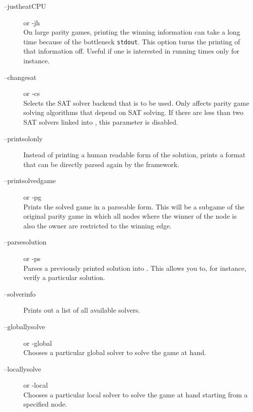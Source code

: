\begin{description}
\item[{\ttfamily --justheatCPU}] \enspace or {\ttfamily -jh}  \\
   On large parity games, printing the winning information can take a long time because of the bottleneck
   \texttt{stdout}. This option turns the printing of that information off. Useful if one is interested in
   running times only for instance.

\item[{\ttfamily --changesat }] \enspace or {\ttfamily -cs }  \\
   Selects the SAT solver backend that is to be used. Only affects parity game solving algorithms that
   depend on SAT solving. If there are less than two SAT solvers linked into \pgsolver, this parameter
   is disabled.

\item[{\ttfamily --printsolonly}] \enspace ${}$ \\
	Instead of printing a human readable form of the solution, \pgsolver prints a
	format that can be directly parsed again by the framework.

\item[{\ttfamily --printsolvedgame}] \enspace or {\ttfamily -pg} \\
	Prints the solved game in a parseable form. This will be a subgame of the
	original parity game in which all nodes where the winner of the node is also
	the owner are restricted to the winning edge.

\item[{\ttfamily --parsesolution }] \enspace or
{\ttfamily -ps }  \\
	Parses a previously printed solution into \pgsolver. This allows you to, for
	instance, verify a particular solution.

\item[{\ttfamily --solverinfo}] \enspace  ${}$ \\
	Prints out a list of all available solvers.

\item[{\ttfamily --globallysolve }] \enspace or
{\ttfamily -global }  \\
	Chooses a particular global solver to solve the game at hand.

\item[{\ttfamily --locallysolve  }]
\enspace or {\ttfamily -local  }  \\
	Chooses a particular local solver to solve the game at hand starting from a
	specified node.


\end{description}
